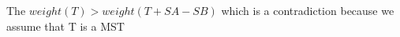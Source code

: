 \documentclass[preview]{standalone}
\begin{document}
\begin{center}
The $weight(T) > weight(T+SA-SB)$ which is a contradiction because we assume that T is a MST
\end{center}
\end{document}
